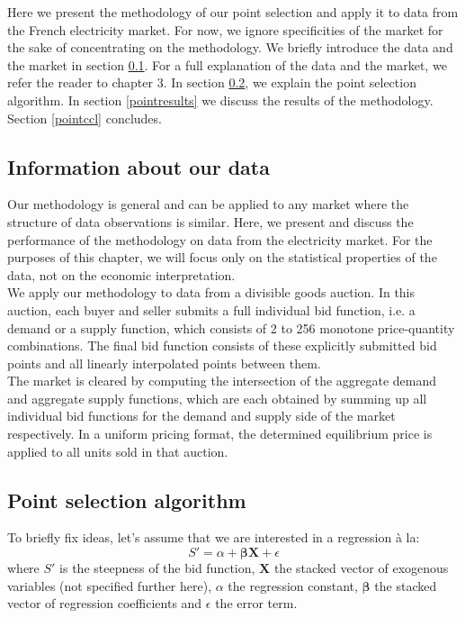 Here we present the methodology of our point selection and apply it to data from the French electricity market. For now, we ignore specificities of the market for the sake of concentrating on the methodology. We briefly introduce the data and the market in section \ref{gleinfo}. For a full explanation of the data and the market, we refer the reader to chapter 3. In section \ref{pointselect}, we explain the point selection algorithm. In section \ref{pointresults} we discuss the results of the methodology. Section \ref{pointccl} concludes.

\subsection{Information about our data}\label{gleinfo}

Our methodology is general and can be applied to any market where the structure of data observations is similar. Here, we present and discuss the performance of the methodology on data from the electricity market. For the purposes of this chapter, we will focus only on the statistical properties of the data, not on the economic interpretation.\\

We apply our methodology to data from a divisible goods auction. In this auction, each buyer and seller submits a full individual bid function, i.e. a demand or a supply function, which consists of 2 to 256 monotone price-quantity combinations. The final bid function consists of these explicitly submitted bid points and all linearly interpolated points between them.\\

The market is cleared by computing the intersection of the aggregate demand and aggregate supply functions, which are each obtained by summing up all individual bid functions for the demand and supply side of the market respectively. In a uniform pricing format, the determined equilibrium price is applied to all units sold in that auction.


\subsection{Point selection algorithm}\label{pointselect}

To briefly fix ideas, let's assume that we are interested in a regression \`{a} la: 
$$ S' = \alpha + \boldsymbol{\beta  X} + \epsilon$$
where $S'$ is the steepness of the bid function, $\boldsymbol{X}$ the stacked vector of exogenous variables (not specified further here), $\alpha$ the regression constant, $\boldsymbol{\beta}$ the stacked vector of regression coefficients and $\epsilon$ the error term. \\


